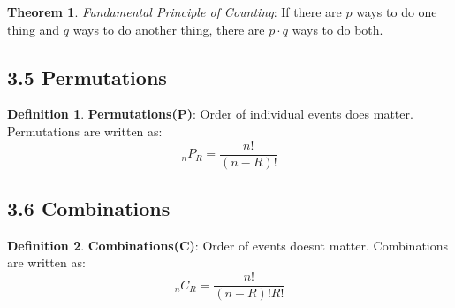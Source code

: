 \documentclass[12pt]{amsart}
\theoremstyle{definition}
\newtheorem{theorem}{Theorem}  %
\newtheorem{definition}{Definition} %
\numberwithin{equation}{theorem}    %
\begin{document}
\begin{theorem}
    \textit{Fundamental Principle of Counting}:
    If there are $p$ ways to do one thing and $q$ ways to do another thing, there are $p \cdot q$ ways to do both. 
\end{theorem}

\subsection*{3.5 Permutations}
\begin{definition}
    \textbf{Permutations(P)}:
    Order of individual events does matter. Permutations are written as: $$_nP_R = \frac{n!}{(n-R)!}$$
\end{definition}

\subsection*{3.6 Combinations}

\begin{definition}
    \textbf{Combinations(C)}:
    Order of events doesnt matter. Combinations are written as:
    $$_nC_R = \frac{n!}{(n-R)!R!}$$ 
\end{definition}
\end{document}
